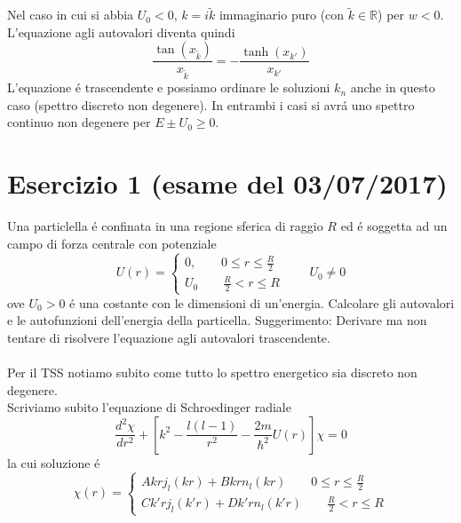 \documentclass[a4paper]{article}
\begin{document}
        Nel caso in cui si abbia $U_0<0$, $k=i\tilde{k}$ immaginario puro (con $\tilde{k}\in\mathbb{R}$) per $w<0$.
        L'equazione agli autovalori diventa quindi
        \begin{equation*}
            \frac{\tan(x_{\tilde{k}})}{x_{\tilde{k}}}=-\frac{\tanh(x_{k'})}{x_{k'}}
        \end{equation*}
        L'equazione \'e trascendente e possiamo ordinare le soluzioni $k_n$ anche in questo caso (spettro discreto non degenere).
        In entrambi i casi si avr\'a uno spettro continuo non degenere per $E\pm U_0\geq 0$.

    \section*{Esercizio 1 (esame del 03/07/2017)}
    Una particlella \'e confinata in una regione sferica di raggio $R$ ed \'e soggetta ad un campo di forza centrale con potenziale
    \begin{equation*}
        U(r)=
        \begin{cases}
            0,\quad\quad 0\leq r\leq\frac{R}{2}\\
            U_0\quad\quad \frac{R}{2}<r\leq R
        \end{cases}
        \quad\quad U_0\neq 0
    \end{equation*}
    ove $U_0 > 0$ \'e una costante con le dimensioni di un'energia. Calcolare gli autovalori e le autofunzioni dell'energia della particella.
    Suggerimento: Derivare ma non tentare di risolvere l'equazione agli autovalori trascendente.
    \\
    \\
    Per il TSS notiamo subito come tutto lo spettro energetico sia discreto non degenere.\\
    Scriviamo subito l'equazione di Schroedinger radiale
    \begin{equation*}
        \frac{d^2\chi}{dr^2}+\left[k^2-\frac{l(l-1)}{r^2}-\frac{2m}{\hbar^2}U(r)\right]\chi=0
    \end{equation*}
    la cui soluzione \'e
    \begin{equation*}
        \chi(r)=
        \begin{cases}
            Akrj_l(kr)+Bkrn_l(kr)\quad\quad 0\leq r\leq\frac{R}{2}\\
            Ck'rj_l(k'r)+Dk'rn_l(k'r)\quad\quad \frac{R}{2}<r\leq R
        \end{cases}
    \end{equation*}
\end{document}
